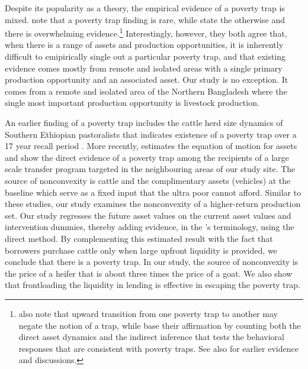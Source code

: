 	Despite its popularity as a theory, the empirical evidence of a poverty trap is mixed. \citet{KraayMcKenzie2014} note that a poverty trap finding is rare, while \citet{BarrettGargMcBride2016} state the otherwise and there is overwhelming evidence.\footnote{\citet{KraayMcKenzie2014} also note that upward transition from one poverty trap to another may negate the notion of a trap, while \citet{BarrettGargMcBride2016} base their affirmation by counting both the direct asset dynamics and the indirect inference that tests the behavioral responses that are consistent with poverty traps. See also \citet{CarterBarrett2006, BarrettCarter2013} for earlier evidence and discussions. } Interestingly, however, they both agree that, when there is a range of assets and production opportunities, it is inherently difficult to emipirically single out a particular poverty trap, and that existing evidence comes mostly from remote and isolated areas with a single primary production opportunity and an associated asset. Our study is no exception. It comes from a remote and isolated area of the Northern Bangladesh where the single most important production opportunity is livestock production.  
	
	An earlier finding of a poverty trap includes the cattle herd size dynamics of Southern Ethiopian pastoralists that indicates existence of a poverty trap over a 17 year recall period \citep{Lybbertetal2004}. More recently, \citet{Balboni2020} estimates the equation of motion for assets and show the direct evidence of a poverty trap among the recipients of a large scale transfer program targeted in the neighbouring areas of our study site. The source of nonconvexity is cattle and the complimentary assets (vehicles) at the baseline which serve as a fixed input that the ultra poor cannot afford. Similar to these studies, our study examines the nonconvexity of a higher-return production set. Our study regresses the future asset values on the current asset values and intervention dummies, thereby adding evidence, in the \citet{BarrettGargMcBride2016}'s terminology, using the direct method. %
	By complementing this estimated result with the fact that borrowers purchase cattle only when large upfront liquidity is provided, we conclude that there is a poverty trap. In our study, the source of nonconvexity is the price of a heifer that is about three times the price of a goat. We also show that frontloading the liquidity in lending is effective in escaping the poverty trap.

